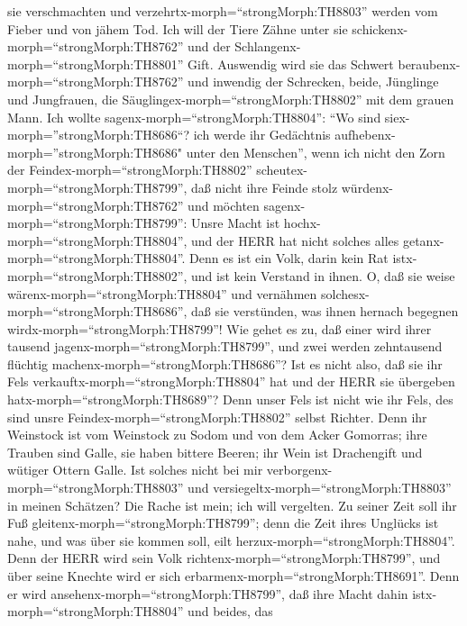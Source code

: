 sie verschmachten und verzehrtx-morph=``strongMorph:TH8803'' werden vom
Fieber und von jähem Tod. Ich will der Tiere Zähne unter sie
schickenx-morph=``strongMorph:TH8762'' und der
Schlangenx-morph=``strongMorph:TH8801'' Gift.  Auswendig
wird sie das Schwert beraubenx-morph=``strongMorph:TH8762'' und inwendig
der Schrecken, beide, Jünglinge und Jungfrauen, die
Säuglingex-morph=``strongMorph:TH8802'' mit dem grauen Mann.
 Ich wollte sagenx-morph=``strongMorph:TH8804'': ``Wo sind
siex-morph=''strongMorph:TH8686``? ich werde ihr Gedächtnis
aufhebenx-morph=''strongMorph:TH8686" unter den Menschen'',
 wenn ich nicht den Zorn der
Feindex-morph=``strongMorph:TH8802''
scheutex-morph=``strongMorph:TH8799'', daß nicht ihre Feinde stolz
würdenx-morph=``strongMorph:TH8762'' und möchten
sagenx-morph=``strongMorph:TH8799'': Unsre Macht ist
hochx-morph=``strongMorph:TH8804'', und der HERR hat nicht solches alles
getanx-morph=``strongMorph:TH8804''.  Denn es ist ein Volk,
darin kein Rat istx-morph=``strongMorph:TH8802'', und ist kein Verstand
in ihnen.  O, daß sie weise
wärenx-morph=``strongMorph:TH8804'' und vernähmen
solchesx-morph=``strongMorph:TH8686'', daß sie verstünden, was ihnen
hernach begegnen wirdx-morph=``strongMorph:TH8799''!  Wie
gehet es zu, daß einer wird ihrer tausend
jagenx-morph=``strongMorph:TH8799'', und zwei werden zehntausend
flüchtig machenx-morph=``strongMorph:TH8686''? Ist es nicht also, daß
sie ihr Fels verkauftx-morph=``strongMorph:TH8804'' hat und der HERR sie
übergeben hatx-morph=``strongMorph:TH8689''?  Denn unser
Fels ist nicht wie ihr Fels, des sind unsre
Feindex-morph=``strongMorph:TH8802'' selbst Richter.  Denn
ihr Weinstock ist vom Weinstock zu Sodom und von dem Acker Gomorras;
ihre Trauben sind Galle, sie haben bittere Beeren;  ihr
Wein ist Drachengift und wütiger Ottern Galle.  Ist solches
nicht bei mir verborgenx-morph=``strongMorph:TH8803'' und
versiegeltx-morph=``strongMorph:TH8803'' in meinen Schätzen?
 Die Rache ist mein; ich will vergelten. Zu seiner Zeit
soll ihr Fuß gleitenx-morph=``strongMorph:TH8799''; denn die Zeit ihres
Unglücks ist nahe, und was über sie kommen soll, eilt
herzux-morph=``strongMorph:TH8804''.  Denn der HERR wird
sein Volk richtenx-morph=``strongMorph:TH8799'', und über seine Knechte
wird er sich erbarmenx-morph=``strongMorph:TH8691''. Denn er wird
ansehenx-morph=``strongMorph:TH8799'', daß ihre Macht dahin
istx-morph=``strongMorph:TH8804'' und beides, das
